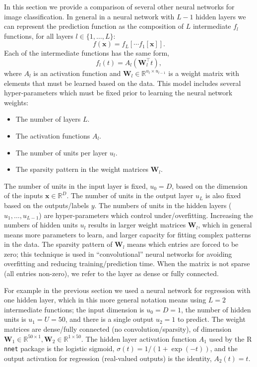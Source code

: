 \documentclass[12pt]{article}
\begin{document}
In this section we provide a comparison of
several other neural networks for image classification. In general in
a neural network with $L-1$ hidden layers we can represent the
prediction function as the composition of $L$ intermediate $f_l$
functions, for all layers $l\in\{1,\dots,L\}$:
\begin{equation}
  f(\mathbf x) = f_L[\cdots f_1[\mathbf x] ].
\end{equation}
Each of the intermediate functions has the same form,
\begin{equation}
  f_l(t) = A_l( \mathbf W_l^\intercal t ),
\end{equation}
where $A_l$ is an activation function and
$\mathbf W_l\in\mathbb R^{u_{l}\times u_{l-1}}$ is a weight matrix with
elements that must be learned based on the data. This model includes
several hyper-parameters which must be fixed prior to learning the
neural network weights:
\begin{itemize}
\item The number of layers $L$.
\item The activation functions $A_l$.
\item The number of units per layer $u_l$.
\item The sparsity pattern in the weight matrices $\mathbf W_l$.
\end{itemize}
The number of units in the input layer is fixed, $u_0=D$, based on the
dimension of the inputs $\mathbf x\in\mathbb R^D$. The number of units
in the output layer $u_L$ is also fixed based on the outputs/labels
$y$. The numbers of units in the hidden layers ($u_1,\dots,u_{L-1}$)
are hyper-parameters which control under/overfitting. Increasing the
numbers of hidden units $u_l$ results in larger weight matrices
$\mathbf W_l$, which in general means more parameters to learn, and
larger capacity for fitting complex patterns in the data. The sparsity
pattern of $\mathbf W_l$ means which entries are forced to be zero;
this technique is used in ``convolutional'' neural networks for
avoiding overfitting and reducing training/prediction time. When the
matrix is not sparse (all entries non-zero), we refer to the layer as
dense or fully connected.

For example in the previous section we used a neural network for
regression with one hidden layer, which in this more general notation
means using $L=2$ intermediate functions; the input dimension is
$u_0=D=1$, the number of hidden units is $u_1=U=50$, and there is a
single output $u_2=1$ to predict. The weight matrices are dense/fully connected (no convolution/sparsity), of
dimension
$\mathbf W_1\in\mathbb R^{50\times 1}, \mathbf W_2\in\mathbb R^{1
  \times 50}$. The hidden layer
activation function $A_1$ used by the R \texttt{nnet} package is the
logistic sigmoid, $\sigma(t)=1/(1+\exp(-t))$, and the output
activation for regression (real-valued outputs) is the identity,
$A_2(t)=t$.
\end{document}
